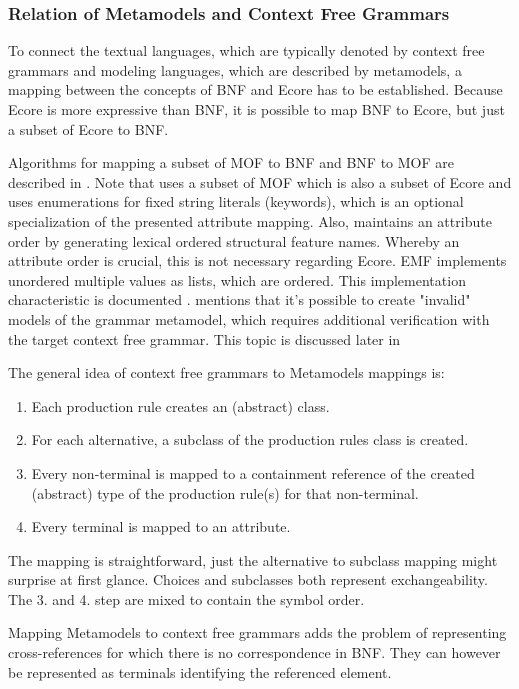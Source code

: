 

\subsubsection{Relation of Metamodels and Context Free Grammars} \label{sec:MM:CFGs}
To connect the textual languages, which are typically denoted by context free grammars and modeling languages, which are described by metamodels, a mapping between the concepts of BNF and Ecore has to be established. Because Ecore is more expressive than BNF, it is possible to map BNF to Ecore, but just a subset of Ecore to BNF.

Algorithms for mapping a subset of MOF to BNF and BNF to MOF are described in \cite{MofCfg}. Note that \cite{MofCfg} uses a subset of MOF which is also a subset of Ecore and uses enumerations for fixed string literals (keywords), which is an optional specialization of the presented attribute mapping. Also,  \cite{MofCfg} maintains an attribute order by generating lexical ordered structural feature names. Whereby an attribute order is crucial, this is not necessary regarding Ecore. EMF implements unordered multiple values as lists, which are ordered. This implementation characteristic is documented \cite{EMF2nd}.  \cite{MofCfg} mentions that it's possible to create "invalid" models of the grammar metamodel, which requires additional verification with the target context free grammar. This topic is discussed later in 

The general idea of context free grammars to Metamodels mappings is:
\begin{enumerate}
	\item Each production rule creates an (abstract) class.
	\item For each alternative,  a subclass of the production rules class is created.
	\item Every non-terminal is mapped to a containment reference of the created (abstract) type of the production rule(s) for that non-terminal.
	\item Every terminal is mapped to an attribute.
\end{enumerate}

The mapping is straightforward, just the alternative to subclass mapping might surprise at first glance. Choices and subclasses both represent exchangeability. The 3. and 4. step are mixed to contain the symbol order.

Mapping Metamodels to context free grammars adds the problem of representing cross-references for which there is no correspondence in BNF. They can however be represented as terminals identifying the referenced element.   

